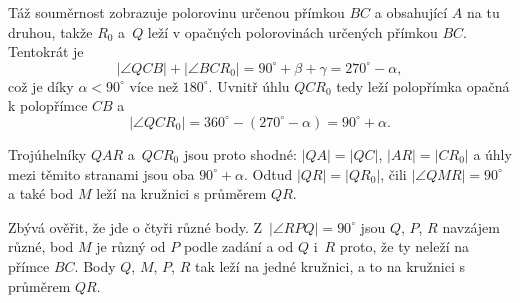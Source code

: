 {    Táž souměrnost zobrazuje polorovinu určenou přímkou $BC$ a obsahující $A$ na tu druhou, takže $R_0$ a~$Q$ leží v opačných polorovinách určených přímkou $BC$. Tentokrát je
    $$
    |\angle QCB| + |\angle BCR_0| = 90^\circ + \beta + \gamma = 270^\circ - \alpha,
    $$
    což je díky $\alpha < 90^\circ$ více než $180^\circ$. Uvnitř úhlu $QCR_0$ tedy leží polopřímka opačná k polopřímce $CB$ a~
    $$
    |\angle QCR_0| = 360^\circ - (270^\circ - \alpha) = 90^\circ + \alpha.
    $$

    Trojúhelníky $QAR$ a~$QCR_0$ jsou proto shodné: $|QA| = |QC|$, $|AR| = |CR_0|$ a úhly mezi těmito stranami jsou oba $90^\circ + \alpha$. Odtud $|QR| = |QR_0|$, čili $|\angle QMR| = 90^\circ$ a také bod $M$ leží na kružnici s průměrem $QR$.

    Zbývá ověřit, že jde o čtyři různé body. Z~$|\angle RPQ| = 90^\circ$ jsou $Q$, $P$, $R$ navzájem různé, bod $M$ je různý od $P$ podle zadání a od $Q$ i~$R$ proto, že ty neleží na přímce $BC$. Body $Q$, $M$, $P$, $R$ tak leží na jedné kružnici, a to na kružnici s průměrem $QR$.
}

